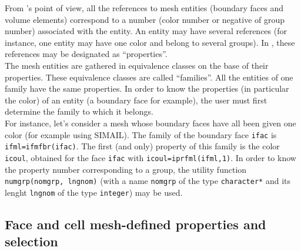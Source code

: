 {{{From \CS 's point of view, all the references to mesh entities (boundary faces
and volume elements) correspond to a number (color number or negative
of group number) associated with the entity. An entity may have several
references (for instance, one entity may have one color and belong to
several groups). In \CS, these references may be designated as
``properties''. \\
The mesh entities are gathered in equivalence classes on the base of
their properties. These equivalence classes are called ``families''. All
the entities of one family have the same properties. In order to know
the properties (in particular the color) of an entity (a boundary face
for example), the user must first determine the family to which it
belongs. \\
For instance, let's consider a mesh whose boundary faces have all been
given one color (for example using SIMAIL). The family of the boundary
face \texttt{ifac} is \texttt{ifml=ifmfbr(ifac)}. The first (and only)
property of this family is the color \texttt{icoul}, obtained for the face
\texttt{ifac} with \texttt{icoul=iprfml(ifml,1)}. In order to know the
property number corresponding to a group, the utility function
\texttt{numgrp(nomgrp, lngnom)} (with a name
\texttt{nomgrp} of the type \texttt{character*} and its lenght
\texttt{lngnom} of the type \texttt{integer}) may be used.

\subsection{Face and cell mesh-defined properties and selection}
\label{sec:selection_criteria}

}}}
